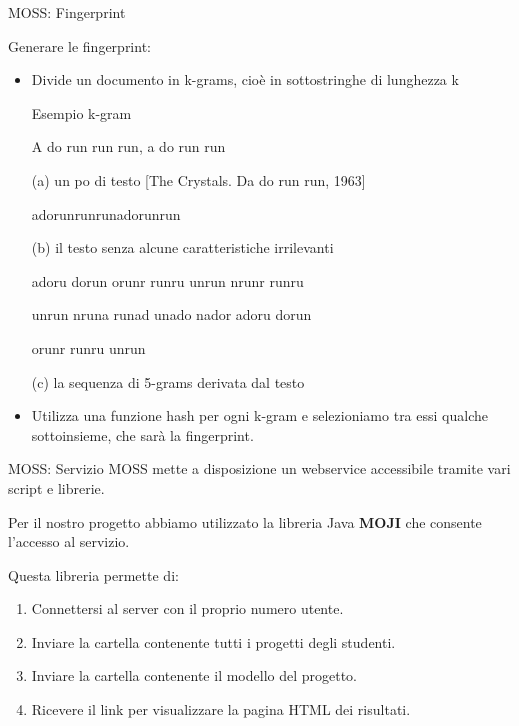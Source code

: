 \documentclass{beamer}
\begin{document}
	\begin{frame}{MOSS: Fingerprint}
		
		{\footnotesize Generare le fingerprint:
		\begin{itemize}[<+->]
			\item Divide un documento in k-grams, cioè in sottostringhe di lunghezza k
			\begin{exampleblock}{\footnotesize Esempio k-gram}
				\begin{tcolorbox}[size=small]
					A do run run run, a do run run
				\end{tcolorbox}
				(a) un po di testo [The Crystals. Da do run run, 1963]
				\pause
				\begin{tcolorbox}[size=small]
					adorunrunrunadorunrun
				\end{tcolorbox}
				(b) il testo senza alcune caratteristiche irrilevanti
				\pause
				\begin{tcolorbox}[size=small]
					adoru dorun orunr runru unrun nrunr runru
					
					unrun nruna runad unado nador adoru dorun
					
					orunr runru unrun
				\end{tcolorbox}
				(c) la sequenza di 5-grams derivata dal testo
			\end{exampleblock}
			\pause
			\item Utilizza una funzione hash per ogni k-gram e selezioniamo tra essi qualche sottoinsieme, che sarà la fingerprint.
		\end{itemize}
	}
	\end{frame}

	\begin{frame}{MOSS: Servizio}
		MOSS mette a disposizione un webservice accessibile tramite vari script e librerie.
		
		Per il nostro progetto abbiamo utilizzato la libreria Java \textbf{MOJI} che consente l'accesso al servizio.
		
		\pause
		Questa libreria permette di:
		\begin{enumerate}[<+->]
			\item Connettersi al server con il proprio numero utente.
			\item Inviare la cartella contenente tutti i progetti degli studenti.
			\item Inviare la cartella contenente il modello del progetto.
			\item Ricevere il link per visualizzare la pagina HTML dei risultati.
		\end{enumerate}
	\end{frame}
\end{document}

